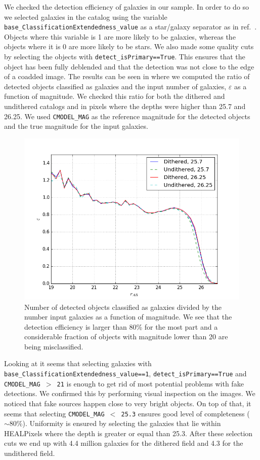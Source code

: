 \documentclass[\docopts]{\docclass}
\begin{document}
We checked the detection efficiency of galaxies in our sample. In order to do so we selected galaxies in the catalog using the variable \texttt{base\_ClassificationExtendedness\_value} as a star/galaxy separator as in ref.~\citep{2017arXiv170506766B}. Objects where this variable is 1 are more likely to be galaxies, whereas the objects where it is 0 are more likely to be stars. We also made some quality cuts by selecting the objects with \texttt{detect\_isPrimary==True}. This ensures that the object has been fully deblended and that the detection was not close to the edge of a coadded image. The results can be seen in  where we computed the ratio of detected objects classified as galaxies and the input number of galaxies, $\varepsilon$ as a function of magnitude. We checked this ratio for both the dithered and undithered catalogs and in pixels where the depths were higher than 25.7 and 26.25. We used \texttt{CMODEL\_MAG} as the reference magnitude for the detected objects and the true magnitude for the input galaxies.

\begin{figure}
\centering
\includegraphics[width=0.9\columnwidth]{completeness.png}
\caption{Number of detected objects classified as galaxies divided by the number input galaxies as a function of magnitude. We see that the detection efficiency is larger than 80\% for the most part and a considerable fraction of objects with magnitude lower than 20 are being misclassified.}
\label{fig:completeness}
\end{figure}

Looking at  it seems that selecting galaxies with \texttt{base\_ClassificationExtendedness\_value==1}, \texttt{detect\_isPrimary==True} and \texttt{CMODEL\_MAG $>$ 21} is enough to get rid of most potential problems with fake detections. We confirmed this by performing visual inspection on the images. We noticed that fake sources happen close to very bright objects. On top of that, it seems that selecting \texttt{CMODEL\_MAG $<$ 25.3} ensures good level of completeness ($\sim 80\%$). Uniformity is ensured by selecting the galaxies that lie within HEALPixels where the depth is greater or equal than 25.3. After these selection cuts we end up with 4.4 million galaxies for the dithered field and 4.3 for the undithered field. 
\end{document}
